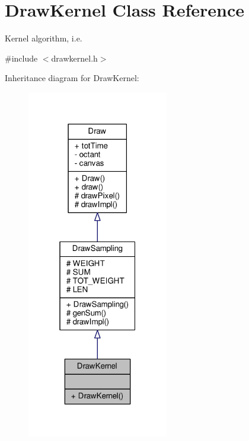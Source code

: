 \hypertarget{classDrawKernel}{}\section{Draw\+Kernel Class Reference}
\label{classDrawKernel}


Kernel algorithm, i.\+e.  




{\ttfamily \#include $<$drawkernel.\+h$>$}



Inheritance diagram for Draw\+Kernel\+:\nopagebreak
\begin{figure}[H]
\begin{center}
\leavevmode
\includegraphics[width=175pt]{classDrawKernel__inherit__graph}
\end{center}
\end{figure}


